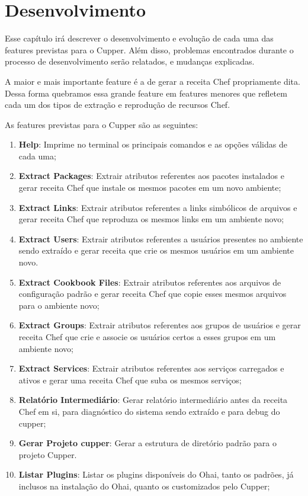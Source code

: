 \newpage\null\thispagestyle{empty}\newpage
\chapter{Desenvolvimento}
\label{chap:dev}

Esse capítulo irá descrever o desenvolvimento e evolução de cada uma das features
previstas para o Cupper. Além disso, problemas encontrados durante o processo
de desenvolvimento serão relatados, e mudanças explicadas.

A maior e mais importante feature é a de gerar a receita Chef propriamente dita.
Dessa forma quebramos essa grande feature em features menores que refletem cada
um dos tipos de extração e reprodução de recursos Chef.

As features previstas para o Cupper são as seguintes:

\begin{enumerate}
  \item \textbf{Help}: Imprime no terminal os principais comandos e as opções
válidas de cada uma;
  \item \textbf{Extract Packages}: Extrair atributos referentes aos pacotes
instalados e gerar receita Chef que instale os mesmos pacotes em um novo ambiente;
  \item \textbf{Extract Links}: Extrair atributos referentes a links simbólicos
de arquivos e gerar receita Chef que reproduza os mesmos links em um ambiente novo;
  \item \textbf{Extract Users}: Extrair atributos referentes a usuários presentes
no ambiente sendo extraído e gerar receita que crie os mesmos usuários em um
ambiente novo.
  \item \textbf{Extract Cookbook Files}: Extrair atributos referentes aos arquivos
de configuração padrão e gerar receita Chef que copie esses mesmos arquivos para o ambiente novo;
  \item \textbf{Extract Groups}: Extrair atributos referentes aos grupos de usuários
e gerar receita Chef que crie e associe os usuários certos a esses grupos em um
ambiente novo;
  \item \textbf{Extract Services}: Extrair atributos referentes aos serviços carregados
e ativos e gerar uma receita Chef que suba os mesmos serviços;
  \item \textbf{Relatório Intermediário}: Gerar relatório intermediário antes
da receita Chef em si, para diagnóstico do sistema sendo extraído e para debug
do cupper;
  \item \textbf{Gerar Projeto cupper}: Gerar a estrutura de diretório padrão 
para o projeto Cupper.
  \item \textbf{Listar Plugins}: Listar os plugins disponíveis do Ohai, tanto 
os padrões, já inclusos na instalação do Ohai, quanto os customizados pelo Cupper;

\end{enumerate}

